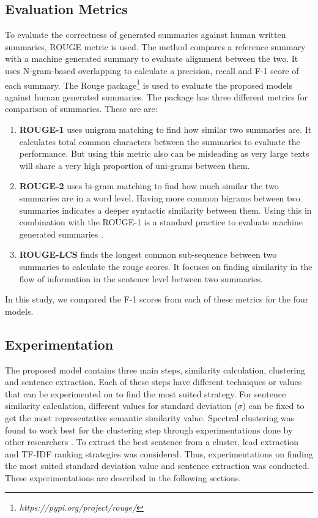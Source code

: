 \documentclass[acmlarge]{acmart}
\begin{document}
\subsection{Evaluation Metrics}\label{subsec:evaluation-metrics}
To evaluate the correctness of generated summaries against human written summaries, ROUGE metric \cite{lin-2004-rouge} is used. The method compares a reference summary with a machine generated summary to evaluate alignment between the two. It uses N-gram-based overlapping to calculate a precision, recall and F-1 score of each summary. The Rouge package\footnote{\textit{https://pypi.org/project/rouge/}} is used to evaluate the proposed models against human generated summaries. The package has three different metrics for comparison of summaries. These are are:
\begin{enumerate}
	\item \textbf{ROUGE-1} uses unigram matching to find how similar two summaries are. It calculates total common characters between the summaries to evaluate the performance. But using this metric also can be misleading as very large texts will share a very high proportion of uni-grams between them.
	\item \textbf{ROUGE-2} uses bi-gram matching to find how much similar the two summaries are in a word level. Having more common bigrams between two summaries indicates a deeper syntactic similarity between them. Using this in combination with the ROUGE-1 is a standard practice to evaluate machine generated summaries \cite{wafaa-2021-summary-comprehensive-review}.
	\item \textbf{ROUGE-LCS} finds the longest common sub-sequence between two summaries to calculate the rouge scores. It focuses on finding similarity in the flow of information in the sentence level between two summaries.
\end{enumerate}
In this study, we compared the F-1 scores from each of these metrics for the four models.
\subsection{Experimentation}\label{subsec:experimentation}
The proposed model contains three main steps, similarity calculation, clustering and sentence extraction. Each of these steps have different techniques or values that can be experimented on to find the most suited strategy. For sentence similarity calculation, different values for standard deviation ($\sigma$) can be fixed to get the most representative semantic similarity value. Spectral clustering was found to work best for the clustering step through experimentations done by other researchers \cite{roychowdhury-etal-2022-spectral-base}. To extract the best sentence from a cluster, lead extraction and TF-IDF ranking strategies was considered. Thus, experimentations on finding the most suited standard deviation value and sentence extraction was conducted. These experimentations are described in the following sections.
\end{document}
